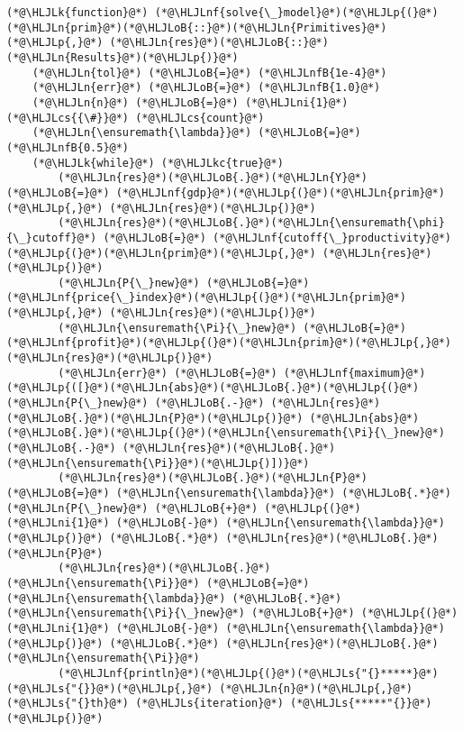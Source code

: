 \documentclass[12pt,a4paper]{article}
\newcommand{\HLJLk}[1]{\textcolor[RGB]{148,91,176}{\textbf{#1}}}
\newcommand{\HLJLkc}[1]{\textcolor[RGB]{59,151,46}{\textit{#1}}}
\newcommand{\HLJLn}[1]{#1}
\newcommand{\HLJLnf}[1]{\textcolor[RGB]{66,102,213}{#1}}
\newcommand{\HLJLs}[1]{\textcolor[RGB]{201,61,57}{#1}}
\newcommand{\HLJLnfB}[1]{\textcolor[RGB]{59,151,46}{#1}}
\newcommand{\HLJLni}[1]{\textcolor[RGB]{59,151,46}{#1}}
\newcommand{\HLJLoB}[1]{\textcolor[RGB]{102,102,102}{\textbf{#1}}}
\newcommand{\HLJLp}[1]{#1}
\newcommand{\HLJLcs}[1]{\textcolor[RGB]{153,153,119}{\textit{#1}}}
\begin{document}
\begin{lstlisting}
(*@\HLJLk{function}@*) (*@\HLJLnf{solve{\_}model}@*)(*@\HLJLp{(}@*)(*@\HLJLn{prim}@*)(*@\HLJLoB{::}@*)(*@\HLJLn{Primitives}@*)(*@\HLJLp{,}@*) (*@\HLJLn{res}@*)(*@\HLJLoB{::}@*)(*@\HLJLn{Results}@*)(*@\HLJLp{)}@*)
    (*@\HLJLn{tol}@*) (*@\HLJLoB{=}@*) (*@\HLJLnfB{1e-4}@*)
    (*@\HLJLn{err}@*) (*@\HLJLoB{=}@*) (*@\HLJLnfB{1.0}@*)
    (*@\HLJLn{n}@*) (*@\HLJLoB{=}@*) (*@\HLJLni{1}@*) (*@\HLJLcs{{\#}}@*) (*@\HLJLcs{count}@*)
    (*@\HLJLn{\ensuremath{\lambda}}@*) (*@\HLJLoB{=}@*) (*@\HLJLnfB{0.5}@*)
    (*@\HLJLk{while}@*) (*@\HLJLkc{true}@*)
        (*@\HLJLn{res}@*)(*@\HLJLoB{.}@*)(*@\HLJLn{Y}@*) (*@\HLJLoB{=}@*) (*@\HLJLnf{gdp}@*)(*@\HLJLp{(}@*)(*@\HLJLn{prim}@*)(*@\HLJLp{,}@*) (*@\HLJLn{res}@*)(*@\HLJLp{)}@*)
        (*@\HLJLn{res}@*)(*@\HLJLoB{.}@*)(*@\HLJLn{\ensuremath{\phi}{\_}cutoff}@*) (*@\HLJLoB{=}@*) (*@\HLJLnf{cutoff{\_}productivity}@*)(*@\HLJLp{(}@*)(*@\HLJLn{prim}@*)(*@\HLJLp{,}@*) (*@\HLJLn{res}@*)(*@\HLJLp{)}@*)
        (*@\HLJLn{P{\_}new}@*) (*@\HLJLoB{=}@*) (*@\HLJLnf{price{\_}index}@*)(*@\HLJLp{(}@*)(*@\HLJLn{prim}@*)(*@\HLJLp{,}@*) (*@\HLJLn{res}@*)(*@\HLJLp{)}@*)
        (*@\HLJLn{\ensuremath{\Pi}{\_}new}@*) (*@\HLJLoB{=}@*) (*@\HLJLnf{profit}@*)(*@\HLJLp{(}@*)(*@\HLJLn{prim}@*)(*@\HLJLp{,}@*) (*@\HLJLn{res}@*)(*@\HLJLp{)}@*)
        (*@\HLJLn{err}@*) (*@\HLJLoB{=}@*) (*@\HLJLnf{maximum}@*)(*@\HLJLp{([}@*)(*@\HLJLn{abs}@*)(*@\HLJLoB{.}@*)(*@\HLJLp{(}@*)(*@\HLJLn{P{\_}new}@*) (*@\HLJLoB{.-}@*) (*@\HLJLn{res}@*)(*@\HLJLoB{.}@*)(*@\HLJLn{P}@*)(*@\HLJLp{)}@*) (*@\HLJLn{abs}@*)(*@\HLJLoB{.}@*)(*@\HLJLp{(}@*)(*@\HLJLn{\ensuremath{\Pi}{\_}new}@*) (*@\HLJLoB{.-}@*) (*@\HLJLn{res}@*)(*@\HLJLoB{.}@*)(*@\HLJLn{\ensuremath{\Pi}}@*)(*@\HLJLp{)])}@*)
        (*@\HLJLn{res}@*)(*@\HLJLoB{.}@*)(*@\HLJLn{P}@*) (*@\HLJLoB{=}@*) (*@\HLJLn{\ensuremath{\lambda}}@*) (*@\HLJLoB{.*}@*) (*@\HLJLn{P{\_}new}@*) (*@\HLJLoB{+}@*) (*@\HLJLp{(}@*)(*@\HLJLni{1}@*) (*@\HLJLoB{-}@*) (*@\HLJLn{\ensuremath{\lambda}}@*)(*@\HLJLp{)}@*) (*@\HLJLoB{.*}@*) (*@\HLJLn{res}@*)(*@\HLJLoB{.}@*)(*@\HLJLn{P}@*)
        (*@\HLJLn{res}@*)(*@\HLJLoB{.}@*)(*@\HLJLn{\ensuremath{\Pi}}@*) (*@\HLJLoB{=}@*) (*@\HLJLn{\ensuremath{\lambda}}@*) (*@\HLJLoB{.*}@*) (*@\HLJLn{\ensuremath{\Pi}{\_}new}@*) (*@\HLJLoB{+}@*) (*@\HLJLp{(}@*)(*@\HLJLni{1}@*) (*@\HLJLoB{-}@*) (*@\HLJLn{\ensuremath{\lambda}}@*)(*@\HLJLp{)}@*) (*@\HLJLoB{.*}@*) (*@\HLJLn{res}@*)(*@\HLJLoB{.}@*)(*@\HLJLn{\ensuremath{\Pi}}@*)
        (*@\HLJLnf{println}@*)(*@\HLJLp{(}@*)(*@\HLJLs{"{}*****}@*) (*@\HLJLs{"{}}@*)(*@\HLJLp{,}@*) (*@\HLJLn{n}@*)(*@\HLJLp{,}@*) (*@\HLJLs{"{}th}@*) (*@\HLJLs{iteration}@*) (*@\HLJLs{*****"{}}@*)(*@\HLJLp{)}@*)

\end{lstlisting}
\end{document}
